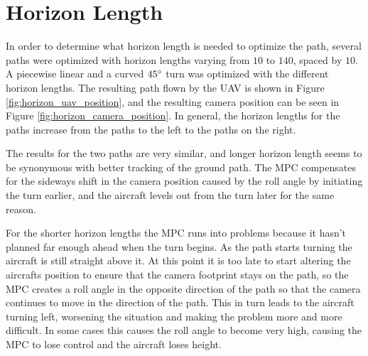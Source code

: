 \section{Horizon Length}

In order to determine what horizon length is needed to optimize the path, several paths were optimized with horizon lengths varying from $10$ to $140$, spaced by $10$. A piecewise linear and a curved $45\degree$ turn was optimized with the different horizon lengths. The resulting path flown by the UAV is shown in Figure \ref{fig:horizon_uav_position}, and the resulting camera position can be seen in Figure \ref{fig:horizon_camera_position}. In general, the horizon lengths for the paths increase from the paths to the left to the paths on the right.

The results for the two paths are very similar, and longer horizon length seems to be synonymous with better tracking of the ground path. The MPC compensates for the sideways shift in the camera position caused by the roll angle by initiating the turn earlier, and the aircraft levels out from the turn later for the same reason.

For the shorter horizon lengths the MPC runs into problems because it hasn't planned far enough ahead when the turn begins. As the path starts turning the aircraft is still straight above it. At this point it is too late to start altering the aircrafts position to ensure that the camera footprint stays on the path, so the MPC creates a roll angle in the opposite direction of the path so that the camera continues to move in the direction of the path. This in turn leads to the aircraft turning left, worsening the situation and making the problem more and more difficult. In some cases this causes the roll angle to become very high, causing the MPC to lose control and the aircraft loses height.


